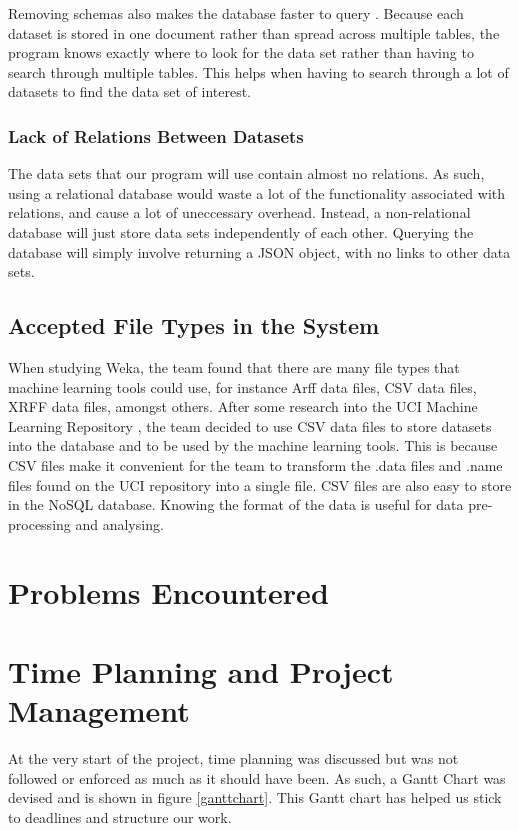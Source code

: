 \documentclass[titlepage]{article}
\begin{document}
Removing schemas also makes the database faster to query \cite{sqlvsnosql}. Because each dataset is stored in one document rather than spread across multiple tables, the program knows exactly where to look for the data set rather than having to search through multiple tables. This helps when having to search through a lot of datasets to find the data set of interest.

\subsubsection{Lack of Relations Between Datasets}
The data sets that our program will use contain almost no relations. As such, using a relational database would waste a lot of the functionality associated with relations, and cause a lot of uneccessary overhead. Instead, a non-relational database will just store data sets independently of each other. Querying the database will simply involve returning a JSON object, with no links to other data sets.

\subsection{Accepted File Types in the System}

When studying Weka, the team found that there are many file types that machine learning tools could use, for instance Arff data files, CSV data files, XRFF data files, amongst others. After some research into the UCI Machine Learning Repository \cite{uci}, the team decided to use CSV data files to store datasets into the database and to be used by the machine learning tools. This is because CSV files make it convenient for the team to transform the .data files and .name files found on the UCI repository into a single file. CSV files are also easy to store in the NoSQL database. Knowing the format of the data is useful for data pre-processing and analysing.

\section{Problems Encountered}

\section{Time Planning and Project Management}
At the very start of the project, time planning was discussed but was not followed or enforced as much as it should have been. As such, a Gantt Chart was devised and is shown in figure \ref{ganttchart}. This Gantt chart has helped us stick to deadlines and structure our work.
\end{document}
